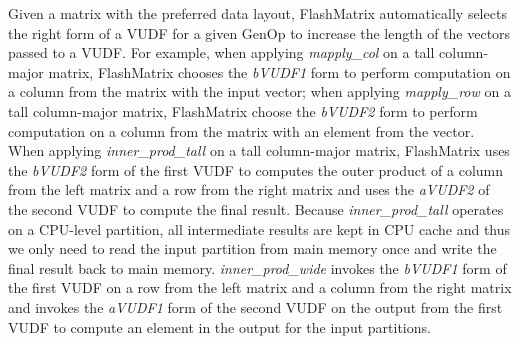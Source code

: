 Given a matrix with the preferred data layout, FlashMatrix automatically
selects the right form of a VUDF for a given GenOp to increase the length of
the vectors passed to a VUDF. For example, when applying \textit{mapply\_col}
on a tall column-major matrix, FlashMatrix chooses the \textit{bVUDF1} form to
perform computation on a column from the matrix with the input vector; when
applying \textit{mapply\_row} on a tall column-major matrix, FlashMatrix choose
the \textit{bVUDF2} form to perform computation on a column from the matrix
with an element from the vector. When applying \textit{inner\_prod\_tall} on a tall
column-major matrix, FlashMatrix uses the \textit{bVUDF2} form of the first
VUDF to computes the outer product of a column from the left matrix and a row
from the right matrix and uses the \textit{aVUDF2} of the second VUDF to compute
the final result. Because \textit{inner\_prod\_tall} operates on a CPU-level
partition, all intermediate results are kept in CPU cache and thus we only need
to read the input partition from main memory once and write the final result
back to main memory. \textit{inner\_prod\_wide} invokes the
\textit{bVUDF1} form of the first VUDF on a row from the left matrix and a column
from the right matrix and invokes the \textit{aVUDF1} form of the second VUDF
on the output from the first VUDF to compute an element in the output for
the input partitions.




